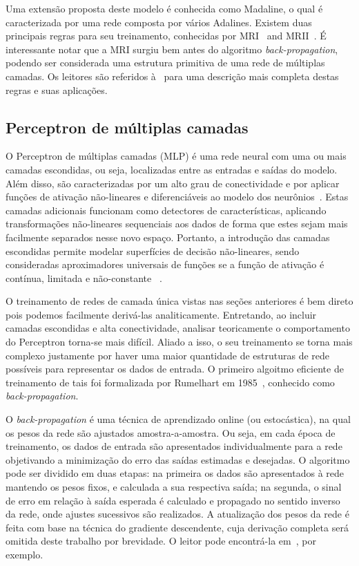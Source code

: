 \documentclass[conference]{IEEEtran}
\begin{document}
	Uma extensão proposta deste modelo é conhecida como Madaline, o qual é caracterizada por uma rede composta por vários Adalines. Existem duas principais regras para seu treinamento, conhecidas por MRI~\cite{widrow1962generalization} and MRII~\cite{winter1988madaline}. É interessante notar que a MRI surgiu bem antes do algoritmo \textit{back-propagation}, podendo ser considerada uma estrutura primitiva de uma rede de múltiplas camadas. Os leitores são referidos à~\cite{widrow199030} para uma descrição mais completa destas regras e suas aplicações.
	
	   
	\subsection{Perceptron de múltiplas camadas}\label{sec:backprop}
	
	O Perceptron de múltiplas camadas (MLP) é uma rede neural com uma ou mais camadas escondidas, ou seja, localizadas entre as entradas e saídas do modelo. Além disso, são caracterizadas por um alto grau de conectividade e por aplicar funções de ativação não-lineares e diferenciáveis ao modelo dos neurônios~\cite{haykin2007neural}. Estas camadas adicionais funcionam como detectores de características, aplicando transformações não-lineares sequenciais aos dados de forma que estes sejam mais facilmente separados nesse novo espaço. Portanto, a introdução das camadas escondidas permite modelar superfícies de decisão não-lineares, sendo consideradas aproximadores universais de funções se a função de ativação é contínua, limitada e não-constante ~\cite{hornik1989multilayer}.
		
	O treinamento de redes de camada única vistas nas seções anteriores é bem direto pois podemos facilmente derivá-las analiticamente. Entretando, ao incluir camadas escondidas e alta conectividade, analisar teoricamente o comportamento do Perceptron torna-se mais difícil. Aliado a isso, o seu treinamento se torna mais complexo justamente por haver uma maior quantidade de estruturas de rede possíveis para representar os dados de entrada. O primeiro algoitmo eficiente de treinamento de tais foi formalizada por Rumelhart em 1985~\cite{rumelhart1985learning}, conhecido como \textit{back-propagation}.    
	
	O \textit{back-propagation} é uma técnica de aprendizado online (ou estocástica), na qual os pesos da rede são ajustados amostra-a-amostra. Ou seja, em cada época de treinamento, os dados de entrada são apresentados individualmente para a rede objetivando a minimização do erro das saídas estimadas e desejadas. O algoritmo pode ser dividido em duas etapas: na primeira os dados são apresentados à rede mantendo os pesos fixos, e calculada a sua respectiva saída; na segunda, o sinal de erro em relação à saída esperada é calculado e propagado no sentido inverso da rede, onde ajustes sucessivos são realizados. A atualização dos pesos da rede é feita com base na técnica do gradiente descendente, cuja derivação completa será omitida deste trabalho por brevidade. O leitor pode encontrá-la em~\cite{rumelhart1985learning, haykin2007neural}, por exemplo. 
	
\end{document}
